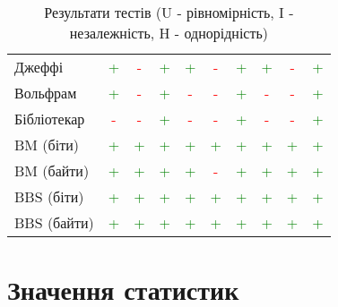 \documentclass[12pt]{article}
\begin{document}
\begin{table}[htbp]
\begin{tabular}{l*{9}{c}}
Джеффі             & \textcolor{green}{+} & \textcolor{red}{-} & \textcolor{green}{+} & \textcolor{green}{+} & \textcolor{red}{-} & \textcolor{green}{+} & \textcolor{green}{+} & \textcolor{red}{-} & \textcolor{green}{+} \\
Вольфрам           & \textcolor{green}{+} & \textcolor{red}{-} & \textcolor{green}{+} & \textcolor{red}{-} & \textcolor{red}{-} & \textcolor{green}{+} & \textcolor{red}{-} & \textcolor{red}{-} & \textcolor{green}{+} \\
Бібліотекар         & \textcolor{red}{-} & \textcolor{red}{-} & \textcolor{green}{+} & \textcolor{red}{-} & \textcolor{red}{-} & \textcolor{green}{+} & \textcolor{red}{-} & \textcolor{red}{-} & \textcolor{green}{+} \\
BM (біти)          & \textcolor{green}{+} & \textcolor{green}{+} & \textcolor{green}{+} & \textcolor{green}{+} & \textcolor{green}{+} & \textcolor{green}{+} & \textcolor{green}{+} & \textcolor{green}{+} & \textcolor{green}{+} \\
BM (байти)         & \textcolor{green}{+} & \textcolor{green}{+} & \textcolor{green}{+} & \textcolor{green}{+} & \textcolor{red}{-} & \textcolor{green}{+} & \textcolor{green}{+} & \textcolor{green}{+} & \textcolor{green}{+} \\
BBS (біти)         & \textcolor{green}{+} & \textcolor{green}{+} & \textcolor{green}{+} & \textcolor{green}{+} & \textcolor{green}{+} & \textcolor{green}{+} & \textcolor{green}{+} & \textcolor{green}{+} & \textcolor{green}{+} \\
BBS (байти)        & \textcolor{green}{+} & \textcolor{green}{+} & \textcolor{green}{+} & \textcolor{green}{+} & \textcolor{green}{+} & \textcolor{green}{+} & \textcolor{green}{+} & \textcolor{green}{+} & \textcolor{green}{+} \\
\bottomrule
\end{tabular}
\caption{Результати тестів (U - рівномірність, I - незалежність, H - однорідність)}
\label{tab:results}
\end{table}

\section{Значення статистик}
\end{document}
